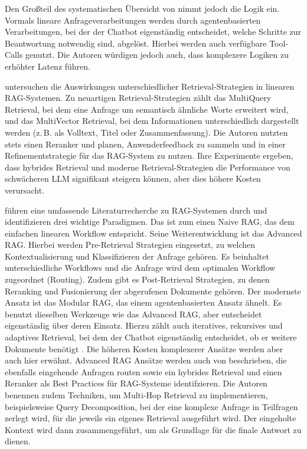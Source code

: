 Den Großteil des systematischen Übersicht von \cite{RAGDevelopment2} nimmt jedoch die Logik ein. Vormals lineare Anfrageverarbeitungen werden durch agentenbasierten Verarbeitungen, bei der der Chatbot eigenständig entscheidet, welche Schritte zur Beantwortung notwendig sind, abgelöst. Hierbei werden auch verfügbare Tool-Calls genutzt. Die Autoren würdigen jedoch auch, dass komplexere Logiken zu erhöhter Latenz führen.

 untersuchen die Auswirkungen unterschiedlicher Retrieval-Strategien in linearen RAG-Systemen. Zu neuartigen Retrieval-Strategien zählt das MultiQuery Retrieval, bei dem eine Anfrage um semantisch ähnliche Worte erweitert wird, und das MultiVector Retrieval, bei dem Informationen unterschiedlich dargestellt werden (z.\,B. als Volltext, Titel oder Zusammenfassung). Die Autoren nutzten stets einen Reranker und planen, Anwenderfeedback zu sammeln und in einer Refinementstrategie für das RAG-System zu nutzen. Ihre Experimente ergeben, dass hybrides Retrieval und moderne Retrieval-Strategien die Performance von schwächeren LLM signifikant steigern können, aber dies höhere Kosten verursacht.

 führen eine umfassende Literaturrecherche zu RAG-Systemen durch und identifizieren drei wichtige Paradigmen. Das ist zum einen Naive RAG, das dem einfachen linearen Workflow entspricht. Seine Weiterentwicklung ist das Advanced RAG. Hierbei werden Pre-Retrieval Strategien eingesetzt, zu welchen Kontextualisierung und Klassifizieren der Anfrage gehören. Es beinhaltet unterschiedliche Workflows und die Anfrage wird dem optimalen Workflow zugeordnet (Routing). Zudem gibt es Post-Retrieval Strategien, zu denen Reranking und Fusionierung der abgerufenen Dokumente gehören. Der modernste Ansatz ist das Modular RAG, das einem agentenbasierten Ansatz ähnelt. Es benutzt dieselben Werkzeuge wie das Advanced RAG, aber entscheidet eigenständig über deren Einsatz. Hierzu zählt auch iteratives, rekursives und adaptives Retrieval, bei dem der Chatbot eigenständig entscheidet, ob er weitere Dokumente benötigt \cite{OlderSource3}. Die höheren Kosten komplexerer Ansätze werden aber auch hier erwähnt. Advanced RAG Ansätze werden auch von  beschrieben, die ebenfalls eingehende Anfragen routen sowie ein hybrides Retrieval und einen Reranker als Best Practices für RAG-Systeme identifzieren. Die Autoren benennen zudem Techniken, um Multi-Hop Retrieval zu implementieren, beispielsweise Query Decomposition, bei der eine komplexe Anfrage in Teilfragen zerlegt wird, für die jeweils ein eigenes Retrieval ausgeführt wird. Der eingeholte Kontext wird dann zusammengeführt, um als Grundlage für die finale Antwort zu dienen.

